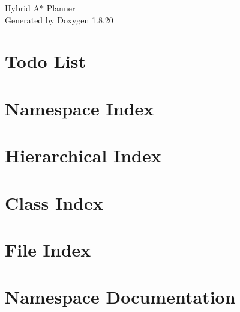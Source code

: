 \let\mypdfximage\pdfximage\def\pdfximage{\immediate\mypdfximage}\documentclass[twoside]{book}
\newcommand{\+}{\discretionary{\mbox{\scriptsize$\hookleftarrow$}}{}{}}
\newcommand{\clearemptydoublepage}{%
  \newpage{\pagestyle{empty}\cleardoublepage}%
}
\begin{document}
\hypersetup{pageanchor=false,
             bookmarksnumbered=true,
             pdfencoding=unicode
            }
\begin{titlepage}
\vspace*{7cm}
\begin{center}%
{\Large Hybrid A$\ast$ Planner }\\
\vspace*{1cm}
{\large Generated by Doxygen 1.8.20}\\
\end{center}
\end{titlepage}
\clearemptydoublepage
{}
\tableofcontents
\clearemptydoublepage
{}
\hypersetup{pageanchor=true}

\chapter{Todo List}
\label{todo}

\chapter{Namespace Index}

\chapter{Hierarchical Index}

\chapter{Class Index}

\chapter{File Index}

\chapter{Namespace Documentation}









\end{document}
